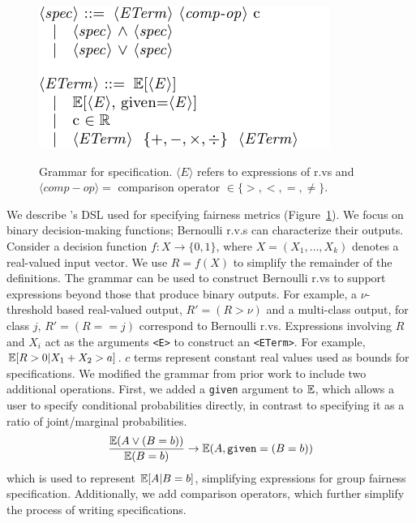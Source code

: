 \begin{figure}
    \centering
    \includegraphics[alt={Grammar describing the metrics which can be implemented AVOIR.}]{avoir/images/grammar}
    \caption{Grammar for specification. $\langle E \rangle$ refers to  expressions of r.vs and $\langle comp-op \rangle = $ comparison operator $\in \{>, <, =, \neq\}$.}
    \label{fig:grammar}
\end{figure}
We describe \AVOIRmethodname{}'s DSL used for specifying fairness metrics (Figure~\ref{fig:grammar}).
We focus on binary decision-making functions; Bernoulli r.v.s can characterize their outputs.
Consider a decision function $f: X \rightarrow \{0, 1\}$, where $X = (X_1, \dots, X_k)$ denotes a real-valued input vector. 
We use $R = f(X)$ to simplify the remainder of the definitions. 
The grammar can be used to construct Bernoulli r.vs to support expressions beyond those that produce binary outputs.
For example, a $\nu$-threshold based real-valued output, $R' = (R > \nu)$ and a multi-class output, for class $j$,  $R' = (R == j)$ correspond to Bernoulli r.vs.
Expressions involving $R$ and $X_i$ act as the arguments \lstinline{<E>} to construct an \lstinline{<ETerm>}.
For example, $\mathbb{E}[R > 0 | X_1 + X_2 > a]$.
$c$ terms represent constant real values used as bounds for specifications.
We modified the grammar from prior work to include two additional operations. 
First, we added a \texttt{given} argument to $\mathbb{E}$, which allows a user to specify conditional probabilities directly, in contrast to specifying it as a ratio of joint/marginal probabilities. 
 \begin{align*}
     \frac{\mathbb{E}(A \vee (B=b))}{\mathbb{E}(B=b)} \rightarrow \mathbb{E}(A, \mathtt{given}=(B=b))
 \end{align*}
 which is used to represent $\mathbb{E}[A|B=b]$, simplifying expressions for group fairness specification.
Additionally, we add comparison operators, which further simplify the process of writing specifications. 

